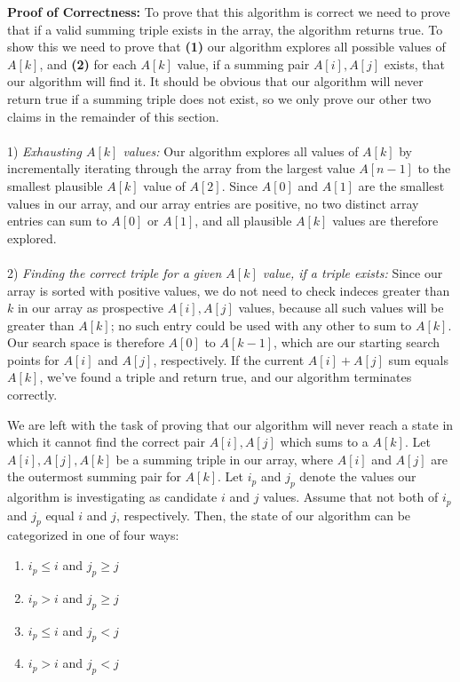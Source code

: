 \documentclass[11pt]{article}
\begin{document}
{\bf Proof of Correctness:} To prove that this algorithm is correct we need to
prove that if a valid summing triple exists in the array, the algorithm returns
true. To show this we need to prove that \textbf{(1)} our algorithm explores all
possible values of $A[k]$, and \textbf{(2)} for each $A[k]$ value, if a summing
pair $A[i], A[j]$ exists, that our algorithm will find it. It should be obvious
that our algorithm will never return true if a summing triple does not exist, 
so we only prove our other two claims in the remainder of this section.\\
\\
1) \textit{Exhausting $A[k]$ values:}	Our algorithm explores all values of $A[k]$ by incrementally iterating
through the array from the largest value $A[n-1]$ to the smallest
plausible $A[k]$ value of $A[2]$. Since $A[0]$ and $A[1]$ are the smallest values
in our array, and our array entries are positive, no two distinct array entries
can sum to $A[0]$ or $A[1]$, and all plausible $A[k]$ values are therefore explored.\\
\\
2) \textit{Finding the correct triple for a given $A[k]$ value, if a triple exists:}
Since our array is sorted with positive values, we do not need to check indeces greater than $k$
in our array as prospective $A[i], A[j]$ values, because all such values will be greater than $A[k]$; 
no such entry could be used with any other to sum to $A[k]$. 
Our search space is therefore $A[0]$ to $A[k-1]$, which are our starting
search points for $A[i]$ and $A[j]$, respectively. If the current $A[i]+A[j]$ sum
equals $A[k]$, we've found a triple and return true, and our algorithm terminates correctly.

We are left with the task of proving that our algorithm will never reach a 
state in which it cannot find the correct pair $A[i], A[j]$ which sums to a 
$A[k]$. Let $A[i], A[j], A[k]$ be a summing triple in our array, where
$A[i]$ and $A[j]$ are the outermost summing pair for $A[k]$. Let $i_p$ and $j_p$
denote the values our algorithm is investigating as candidate $i$ and $j$ values. 
Assume that not both of $i_p$ and $j_p$ equal $i$ and $j$, respectively. Then,
the state of our algorithm can be categorized in one of four ways: 
\begin{enumerate} 
\item
    $i_p \leq i$ and $j_p \geq j$
\item
    $i_p > i$ and $j_p \geq j$
\item
    $i_p \leq i$ and $j_p < j$
\item
    $i_p > i$ and $j_p < j$
\end{enumerate}
\end{document}

